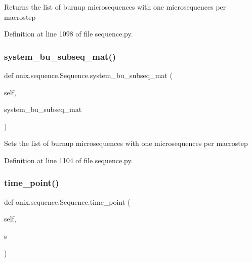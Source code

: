 \begin{DoxyVerb}Returns the list of burnup microsequences with one microsequences per macrostep
\end{DoxyVerb}
 

Definition at line 1098 of file sequence.\+py.

\mbox{\label{classonix_1_1sequence_1_1Sequence_a59ce4ba65b6e12a5a4230ccd6b0f4215}} 
\subsubsection{\texorpdfstring{system\+\_\+bu\+\_\+subseq\+\_\+mat()}{system\_bu\_subseq\_mat()}\hspace{0.1cm}{\footnotesize\ttfamily [2/2]}}
{\footnotesize\ttfamily def onix.\+sequence.\+Sequence.\+system\+\_\+bu\+\_\+subseq\+\_\+mat (\begin{DoxyParamCaption}\item[{}]{self,  }\item[{}]{system\+\_\+bu\+\_\+subseq\+\_\+mat }\end{DoxyParamCaption})}

\begin{DoxyVerb}Sets the list of burnup microsequences with one microsequences per macrostep
\end{DoxyVerb}
 

Definition at line 1104 of file sequence.\+py.

\mbox{\label{classonix_1_1sequence_1_1Sequence_af34c5779028d0a5a354849868ad4f0a6}} 
\subsubsection{\texorpdfstring{time\+\_\+point()}{time\_point()}}
{\footnotesize\ttfamily def onix.\+sequence.\+Sequence.\+time\+\_\+point (\begin{DoxyParamCaption}\item[{}]{self,  }\item[{}]{s }\end{DoxyParamCaption})}

